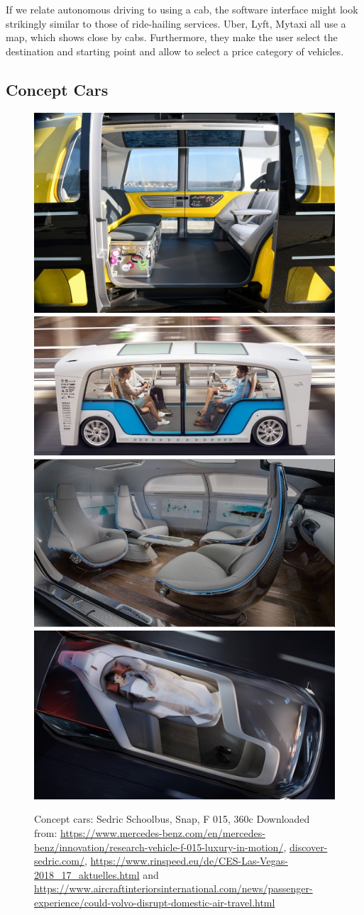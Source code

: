 If we relate autonomous driving to using a cab, the software interface might look strikingly similar to those of ride-hailing services. Uber, Lyft, Mytaxi all use a map, which shows close by cabs. Furthermore, they make the user select the destination and starting point and allow to select a price category of vehicles.  

\subsection{Concept Cars}
\label{sec:conceptcars}
\begin{figure}
    \includegraphics[height=0.2725\textwidth]{fig/school_bus_Mittel.jpg}\hfill\includegraphics[height=0.2725\textwidth]{fig/snap.jpg}\newline\includegraphics[height=0.28\textwidth]{fig/mercedes.JPG}\hfill\includegraphics[height=0.28\textwidth]{fig/360c_Mittel.jpg}
    \caption[Concept Cars]{Concept cars: Sedric Schoolbus, Snap, F 015, 360c Downloaded from: \url{https://www.mercedes-benz.com/en/mercedes-benz/innovation/research-vehicle-f-015-luxury-in-motion/}, \url{discover-sedric.com/}, \url{https://www.rinspeed.eu/de/CES-Las-Vegas-2018_17_aktuelles.html} and \url{https://www.aircraftinteriorsinternational.com/news/passenger-experience/could-volvo-disrupt-domestic-air-travel.html}}
    \label{fig:conceptcars}
\end{figure}
